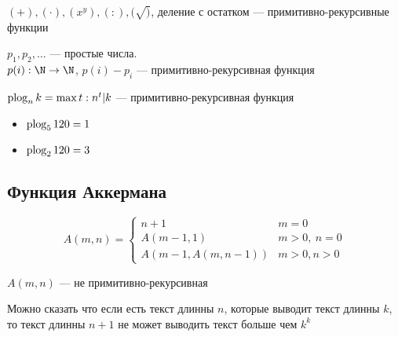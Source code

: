 \documentclass[english]{article}
\begin{document}
\begin{theorem}
	\((+), (\cdot), (x^y), (:), (\sqrt)\), деление с остатком --- примитивно-рекурсивные функции
	\label{org54c4050}
\end{theorem}
\begin{lemma}
	\(p_1, p_2, \dots\) --- простые числа. \\
	\(p(i): \N \to \N\), \(p(i) - p_i\) --- примитивно-рекурсивная функция
	\label{org34026cc}
\end{lemma}
\begin{definition}
	\(\mathop{\rm plog}_nk = \max t: n^t | k\) --- примитивно-рекурсивная функция
	\label{org7fbcdc5}
\end{definition}
\begin{examp}
	\-
	\begin{itemize}
		\item \(\mathop{\rm plog}_5 120 = 1\)
		\item \(\mathop{\rm plog}_2 120 = 3\)
	\end{itemize}
\end{examp}
\subsection{Функция Аккермана}
\label{sec:orgc7abfc8}
\[ A(m, n) = \begin{cases}
		n + 1                 & m = 0         \\
		A(m - 1, 1)           & m > 0,\ n = 0 \\
		A(m - 1, A(m, n - 1)) & m > 0, n > 0
	\end{cases} \]
\begin{lemma}
	\(A(m, n)\) --- не примитивно-рекурсивная
\end{lemma}
Можно сказать что если есть текст длинны \(n\), которые выводит текст длинны \(k\), то текст длинны \(n + 1\) не может выводить текст больше чем \(k^k\) \fixme
\end{document}
